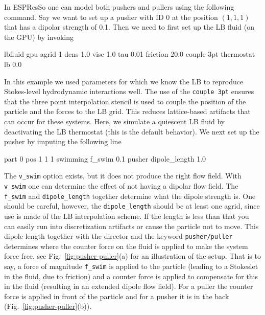 \documentclass[aip,jcp,reprint,a4paper,onecolumn,amsmath]{revtex4-1}
\newcommand{\es}{\mbox{\textsf{ESPResSo}}\xspace}
\newcommand\codees{\lstinline[language=espresso]}
\begin{document}
In \es{} one can model both pushers and pullers using the following command. Say we want to set up a pusher with ID 0 at the position $(1,1,1)$ that has a dipolar strength of 0.1. Then we need to first set up the LB fluid (on the GPU) by invoking
\begin{espresso}
lbfluid gpu agrid 1 dens 1.0 visc 1.0 tau 0.01 friction 20.0 couple 3pt
thermostat lb 0.0
\end{espresso}
In this example we used parameters for which we know the LB to reproduce Stokes-level hydrodynamic interactions well. The use of the \codees{couple 3pt} ensures that the three point interpolation stencil is used to couple the position of the particle and the forces to the LB grid. This reduces lattice-based artifacts that can occur for these systems. Here, we simulate a quiescent LB fluid by deactivating the LB thermostat (this is the default behavior). We next set up the pusher by imputing the following line
\begin{espresso}
part 0 pos 1 1 1 swimming f_swim 0.1 pusher dipole_length 1.0
\end{espresso}
The \codees{v_swim} option exists, but it does not produce the right flow field. With \codees{v_swim} one can determine the effect of not having a dipolar flow field. The \codees{f_swim} and \codees{dipole_length} together determine what the dipole strength is. One should be careful, however, the \codees{dipole_length} should be at least one agrid, since use is made of the LB interpolation scheme. If the length is less than that you can easily run into discretization artifacts or cause the particle not to move. This dipole length together with the director and the keyword \codees{pusher/puller} determines where the counter force on the fluid is applied to make the system force free, see Fig.~\ref{fig:pusher-puller}(a) for an illustration of the setup. That is to say, a force of magnitude \codees{f_swim} is applied to the particle (leading to a Stokeslet in the fluid, due to friction) and a counter force is applied to compensate for this in the fluid (resulting in an extended dipole flow field). For a puller the counter force is applied in front of the particle and for a pusher it is in the back (Fig.~\ref{fig:pusher-puller}(b)).
\end{document}
